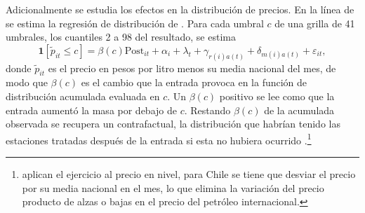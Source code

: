 Adicionalmente se estudia los efectos en la distribución de precios. En la línea de \textcite{FISCHER2025} se estima la regresión de distribución de \textcite{CHERNOZHUKOV2013}. Para cada umbral $c$ de una grilla de 41 umbrales, los cuantiles 2 a 98 del resultado, se estima
\begin{equation}
    \mathbf{1}[\tilde{p}_{it}\leq c] = \beta(c) \text{Post}_{it} + \alpha_i + \lambda_t + \gamma_{r(i)a(t)} + \delta_{m(i)a(t)} + \varepsilon_{it},
\end{equation}
donde $\tilde{p}_{it}$ es el precio en pesos por litro menos su media nacional del mes, de modo que $\beta(c)$ es el cambio que la entrada provoca en la función de distribución acumulada evaluada en $c$. Un $\beta(c)$ positivo se lee como que la entrada aumentó la masa por debajo de $c$. Restando $\beta(c)$ de la acumulada observada se recupera un contrafactual, la distribución que habrían tenido las estaciones tratadas después de la entrada si esta no hubiera ocurrido \parencite{FISCHER2025}.\footnote{\textcite{FISCHER2025} aplican el ejercicio al precio en nivel, para Chile se tiene que desviar el precio por su media nacional en el mes, lo que elimina la variación del precio producto de alzas o bajas en el precio del petróleo internacional.}


